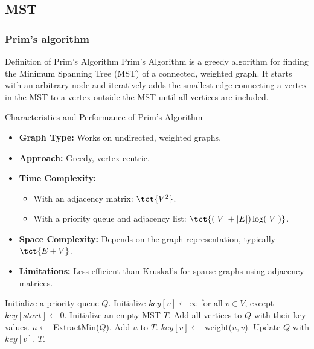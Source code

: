 \newpage
\subsection{MST}
\subsubsection{Prim's algorithm}
\begin{definition}[]{Definition of Prim's Algorithm}
    Prim's Algorithm is a greedy algorithm for finding the Minimum Spanning Tree (MST) of a connected, weighted graph. 
    It starts with an arbitrary node and iteratively adds the smallest edge connecting a vertex in the MST to a vertex outside the MST until all vertices are included.
\end{definition}

\begin{properties}[]{Characteristics and Performance of Prim's Algorithm}
    \begin{itemize}
        \item \textbf{Graph Type:} Works on undirected, weighted graphs.
        \item \textbf{Approach:} Greedy, vertex-centric.
        \item \textbf{Time Complexity:}
              \begin{itemize}
                  \item With an adjacency matrix: $\tct{V^2}$.
                  \item With a priority queue and adjacency list: $\tct{(|V| + |E|) \log(|V|)}$.
              \end{itemize}
        \item \textbf{Space Complexity:} Depends on the graph representation, typically $\tct{E + V}$.
        \item \textbf{Limitations:} Less efficient than Kruskal's for sparse graphs using adjacency matrices.
    \end{itemize}
\end{properties}

\begin{algorithm}
    \caption{Prim's Algorithm}
    \begin{algorithmic}[1]
            \State Initialize a priority queue $Q$.
            \State Initialize $key[v] \gets \infty$ for all $v \in V$, except $key[start] \gets 0$.
            \State Initialize an empty MST $T$.
            \State Add all vertices to $Q$ with their key values.
                \State $u \gets$ ExtractMin($Q$).
                \State Add $u$ to $T$.
                        \State $key[v] \gets$ weight($u, v$).
                        \State Update $Q$ with $key[v]$.
                    \EndIf
                \EndFor
            \EndWhile
            \State \Return $T$.
        \EndProcedure
    \end{algorithmic}
\end{algorithm}

